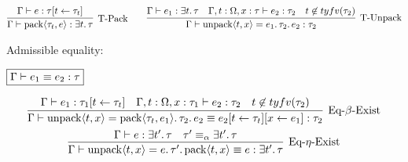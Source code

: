 \begin{gather*}
  \infer[\text{T-Pack}]{\Gamma \vdash \sympack\langle \tau_t, e\rangle: \exists t\ldotp \tau}{
    \Gamma \vdash e: \tau[t \assign \tau_t]
  }
  \hspace{2em}
  \infer[\text{T-Unpack}]{\Gamma \vdash \symunpack\langle t, x\rangle = e_1\ldotp \tau_2\ldotp e_2: \tau_2}{
    \Gamma \vdash e_1: \exists t\ldotp \tau
    &
    \Gamma, t: \Omega, x: \tau \vdash e_2: \tau_2
    &
    t \not\in \typefreevar(\tau_2)
  }
\end{gather*}

Admissible equality:

$\fbox{$\Gamma \vdash e_1 \equiv e_2: \tau$}$

\begin{gather*}
  \infer[\text{Eq-$\beta$-Exist}]{\Gamma \vdash \symunpack\langle t, x\rangle = \sympack\langle \tau_t, e_1\rangle\ldotp \tau_2\ldotp e_2 \equiv e_2[t \assign \tau_t][x \assign e_1]: \tau_2}{
    \Gamma \vdash e_1: \tau_1[t \assign \tau_t]
    &
    \Gamma, t: \Omega, x: \tau_1 \vdash e_2: \tau_2
    &
    t \not\in \typefreevar(\tau_2)
  }
  \\
  \infer[\text{Eq-$\eta$-Exist}]{\Gamma \vdash \symunpack\langle t, x\rangle = e\ldotp\tau'\ldotp \sympack\langle t, x\rangle \equiv e: \exists t'\ldotp \tau}{
    \Gamma \vdash e: \exists t'\ldotp \tau
    &
    \tau' \equiv_\alpha \exists t'\ldotp \tau
  }
\end{gather*}
